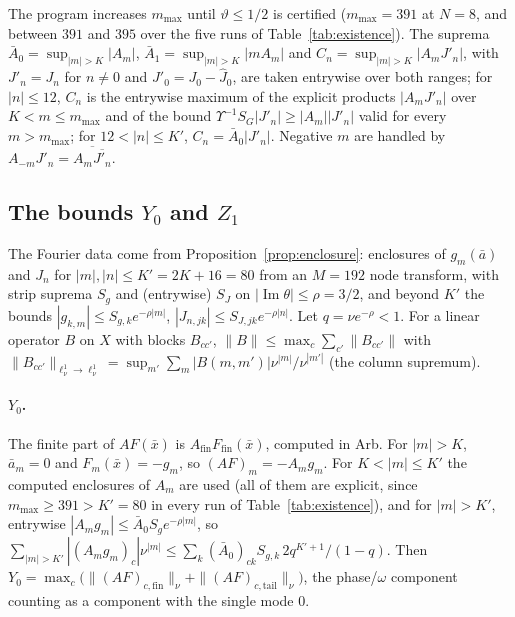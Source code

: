 \documentclass[11pt]{article}
\theoremstyle{definition}
\newcommand{\im}{\operatorname{Im}}
\begin{document}
The program increases $m_{\max}$ until $\vartheta \le 1/2$ is certified ($m_{\max} = 391$ at $N = 8$, and between $391$ and $395$ over the five runs of Table~\ref{tab:existence}). The suprema $\bar A_0 = \sup_{|m| > K}|A_m|$, $\bar A_1 = \sup_{|m| > K}|mA_m|$ and $C_n = \sup_{|m| > K}|A_m J'_n|$, with $J'_n = J_n$ for $n \ne 0$ and $J'_0 = J_0 - \hat J_0$, are taken entrywise over both ranges; for $|n| \le 12$, $C_n$ is the entrywise maximum of the explicit products $|A_mJ'_n|$ over $K < m \le m_{\max}$ and of the bound $\Upsilon^{-1}S_G|J'_n| \ge |A_m||J'_n|$ valid for every $m > m_{\max}$; for $12 < |n| \le K'$, $C_n = \bar A_0|J'_n|$. Negative $m$ are handled by $A_{-m}J'_n = \overline{A_m \overline{J'_n}}$.

\subsection{The bounds \texorpdfstring{$Y_0$}{Y0} and \texorpdfstring{$Z_1$}{Z1}}\label{sec:Y0Z1}

The Fourier data come from Proposition~\ref{prop:enclosure}: enclosures of $g_m(\bar a)$ and $J_n$ for $|m|, |n| \le K' = 2K + 16 = 80$ from an $M = 192$ node transform, with strip suprema $S_g$ and (entrywise) $S_J$ on $|\im\theta| \le \rho = 3/2$, and beyond $K'$ the bounds $|g_{k,m}| \le S_{g,k}e^{-\rho|m|}$, $|J_{n,jk}| \le S_{J,jk}e^{-\rho|n|}$. Let $q = \nu e^{-\rho} < 1$. For a linear operator $B$ on $X$ with blocks $B_{cc'}$, $\|B\| \le \max_c \sum_{c'}\|B_{cc'}\|$ with $\|B_{cc'}\|_{\ell^1_\nu \to \ell^1_\nu} = \sup_{m'}\sum_m |B(m,m')|\nu^{|m|}/\nu^{|m'|}$ (the column supremum).

\paragraph{$Y_0$.} The finite part of $AF(\bar x)$ is $A_{\mathrm{fin}}F_{\mathrm{fin}}(\bar x)$, computed in Arb. For $|m| > K$, $\bar a_m = 0$ and $F_m(\bar x) = -g_m$, so $(AF)_m = -A_m g_m$. For $K < |m| \le K'$ the computed enclosures of $A_m$ are used (all of them are explicit, since $m_{\max} \ge 391 > K' = 80$ in every run of Table~\ref{tab:existence}), and for $|m| > K'$, entrywise $|A_mg_m| \le \bar A_0 S_g e^{-\rho|m|}$, so $\sum_{|m| > K'}|(A_mg_m)_c|\nu^{|m|} \le \sum_k(\bar A_0)_{ck}S_{g,k}\,2q^{K'+1}/(1 - q)$. Then $Y_0 = \max_c\big(\|(AF)_{c,\mathrm{fin}}\|_\nu + \|(AF)_{c,\mathrm{tail}}\|_\nu\big)$, the phase/$\omega$ component counting as a component with the single mode $0$.
\end{document}
